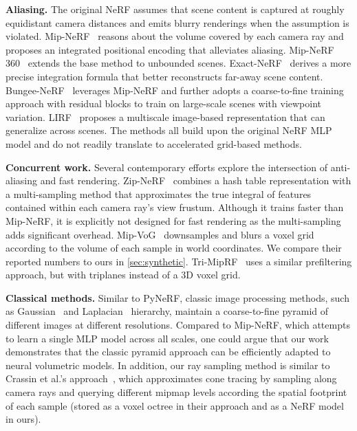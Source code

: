 \documentclass{article}
\newcommand{\method}{PyNeRF\xspace}
\begin{document}
\textbf{Aliasing.} The original NeRF assumes that scene content is captured at roughly equidistant camera distances and emits blurry renderings when the assumption is violated. Mip-NeRF~\cite{barron2021mipnerf} reasons about the volume covered by each camera ray and proposes an integrated positional encoding that alleviates aliasing. Mip-NeRF 360~\cite{barron2022mipnerf360} extends the base method to unbounded scenes. Exact-NeRF~\cite{isaacmedina2023exactnerf} derives a more precise integration formula that better reconstructs far-away scene content. Bungee-NeRF~\cite{xiangli2022bungeenerf} leverages Mip-NeRF and further adopts a coarse-to-fine training approach with residual blocks to train on large-scale scenes with viewpoint variation. LIRF~\cite{huang2023lirf} proposes a multiscale image-based representation that can generalize across scenes. The methods all build upon the original NeRF MLP model and do not readily translate to accelerated grid-based methods.

\textbf{Concurrent work.} Several contemporary efforts explore the intersection of anti-aliasing and fast rendering. Zip-NeRF~\cite{barron2023zipnerf} combines a hash table representation with a multi-sampling method that approximates the true integral of features contained within each camera ray's view frustum. Although it trains faster than Mip-NeRF, it is explicitly not designed for fast rendering as the multi-sampling adds significant overhead.  Mip-VoG~\cite{hu2023multiscale} downsamples and blurs a voxel grid according to the volume of each sample in world coordinates. We compare their reported numbers to ours in \cref{sec:synthetic}. Tri-MipRF~\cite{hu2023Tri-MipRF} uses a similar prefiltering approach, but with triplanes instead of a 3D voxel grid.

\textbf{Classical methods.} Similar to \method, classic image processing methods, such as Gaussian~\cite{gaussian_pyramids} and Laplacian~\cite{laplacian} hierarchy, maintain a coarse-to-fine pyramid of different images at different resolutions. Compared to Mip-NeRF, which attempts to learn a single MLP model across all scales, one could argue that our work demonstrates that the classic pyramid approach can be efficiently adapted to neural volumetric models. In addition, our ray sampling method is similar to Crassin et al.'s approach~\cite{voxel-cone-tracing}, which approximates cone tracing by sampling along camera rays and querying different mipmap levels according the spatial footprint of each sample (stored as a voxel octree in their approach and as a NeRF model in ours).
\end{document}
